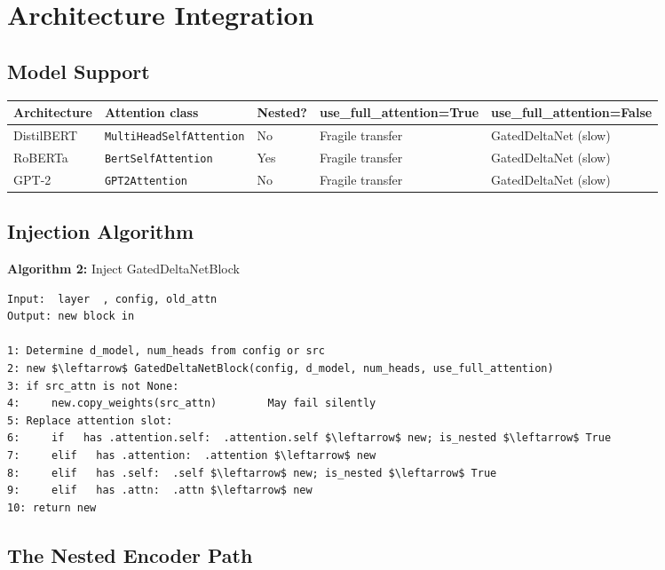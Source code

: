 
\section{Architecture Integration}

\subsection{Model Support}

\begin{table}[H]
\centering
\small
\begin{tabular}{lllll}
\toprule
\textbf{Architecture} & \textbf{Attention class} & \textbf{Nested?} & \textbf{use\_full\_attention=True} & \textbf{use\_full\_attention=False} \\
\midrule
DistilBERT & \texttt{MultiHeadSelfAttention} & No & Fragile transfer & GatedDeltaNet (slow) \\
RoBERTa & \texttt{BertSelfAttention} & Yes & Fragile transfer & GatedDeltaNet (slow) \\
GPT-2 & \texttt{GPT2Attention} & No & Fragile transfer & GatedDeltaNet (slow) \\
\bottomrule
\end{tabular}
\end{table}

\subsection{Injection Algorithm}

\textbf{Algorithm 2:} Inject GatedDeltaNetBlock
\begin{lstlisting}
Input:  layer  , config, old_attn
Output: new block in  

1: Determine d_model, num_heads from config or src
2: new $\leftarrow$ GatedDeltaNetBlock(config, d_model, num_heads, use_full_attention)
3: if src_attn is not None:
4:     new.copy_weights(src_attn)        May fail silently
5: Replace attention slot:
6:     if   has .attention.self:  .attention.self $\leftarrow$ new; is_nested $\leftarrow$ True
7:     elif   has .attention:  .attention $\leftarrow$ new
8:     elif   has .self:  .self $\leftarrow$ new; is_nested $\leftarrow$ True
9:     elif   has .attn:  .attn $\leftarrow$ new
10: return new
\end{lstlisting}

\subsection{The Nested Encoder Path}

